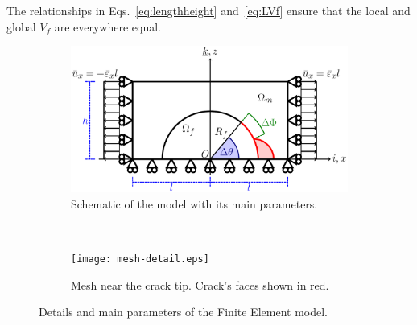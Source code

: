 \documentclass[review]{elsarticle}
\begin{document}
The relationships in Eqs.~\ref{eq:lengthheight} and~\ref{eq:LVf} ensure that the local and global $V_{f}$ are everywhere equal. 

\begin{figure}[!h]
\centering
    \begin{subfigure}[b]{0.55\textwidth}
        \includegraphics[width=\textwidth]{RUC.pdf}
        \caption{Schematic of the model with its main parameters.}\label{subfig:modelschem}
    \end{subfigure} ~
    \begin{subfigure}[b]{0.4\textwidth}
        \texttt{[image: mesh-detail.eps]}
        \caption{Mesh near the crack tip. Crack's faces shown in red.}\label{subfig:meshdetail}
    \end{subfigure}

\caption{Details and main parameters of the Finite Element model.}\label{fig:FEmodel}
\end{figure}
\end{document}
